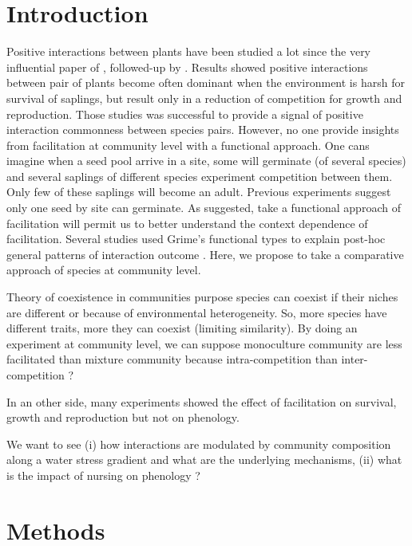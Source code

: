 \documentclass[12pt]{article} %
\begin{document}
\section{Introduction}

Positive interactions between plants have been studied a lot since the very influential paper of \citep{Bertness1994}, followed-up by \citep{Bruno2003}. Results showed positive interactions between pair of plants become often dominant when the environment is harsh for survival of saplings, but result only in a reduction of competition for growth and reproduction\citep{He2013}. Those studies was successful to provide a signal of positive interaction commonness between species pairs. However, no one provide insights from facilitation at community level with a functional approach. One cans imagine when a seed pool arrive in a site, some will germinate (of several species) and several saplings of different species experiment competition between them. Only few of these saplings will become an adult. Previous experiments suggest only one seed by site can germinate. As \citet{Butterfield2013} suggested, take a functional approach of facilitation will permit us to better understand the context dependence of facilitation. Several studies used Grime's functional types to explain post-hoc general patterns of interaction outcome \citep{Maestre2009,Butterfield2013}. Here, we propose to take a comparative approach of species at community level.

Theory of coexistence in communities purpose species can coexist if their niches are different or because of environmental heterogeneity. So, more species have different traits, more they can coexist (limiting similarity). By doing an experiment at community level, we can suppose monoculture community are less facilitated than mixture community because intra-competition than inter-competition ?

In an other side, many experiments showed the effect of facilitation on survival, growth and reproduction but not on phenology. 

We want to see (i) how interactions are modulated by community composition along a water stress gradient and what are the underlying mechanisms, (ii) what is the impact of nursing on phenology ?



\section{Methods}
\end{document}
